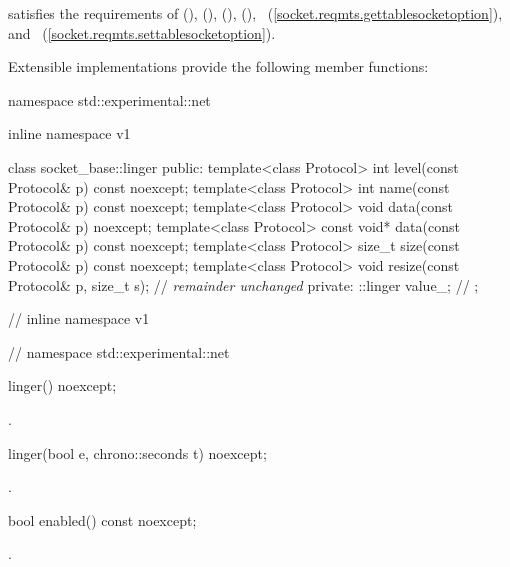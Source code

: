 \pnum
{} satisfies the requirements of  (),  (),  (),  (), ~(\ref{socket.reqmts.gettablesocketoption}), and ~(\ref{socket.reqmts.settablesocketoption}).

%
\pnum
 Extensible implementations provide the following member functions:

\begin{codeblock}
namespace std::experimental::net {
inline namespace v1 {

  class socket_base::linger
  {
  public:
    template<class Protocol> int level(const Protocol& p) const noexcept;
    template<class Protocol> int name(const Protocol& p) const noexcept;
    template<class Protocol> void data(const Protocol& p) noexcept;
    template<class Protocol> const void* data(const Protocol& p) const noexcept;
    template<class Protocol> size_t size(const Protocol& p) const noexcept;
    template<class Protocol> void resize(const Protocol& p, size_t s);
    // \textit{remainder unchanged}
  private:
    ::linger value_;  // \expos
  };

} // inline namespace v1
} // namespace std::experimental::net
\end{codeblock}

\begin{itemdecl}
linger() noexcept;
\end{itemdecl}

\begin{itemdescr}
\pnum
\postconditions {}.
\end{itemdescr}

\begin{itemdecl}
linger(bool e, chrono::seconds t) noexcept;
\end{itemdecl}

\begin{itemdescr}
\pnum
\postconditions {}.
\end{itemdescr}

\begin{itemdecl}
bool enabled() const noexcept;
\end{itemdecl}

\begin{itemdescr}
\pnum
\returns {}.
\end{itemdescr}

